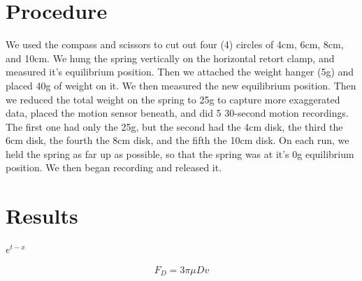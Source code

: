\documentclass[12pt,letterpaper]{article}
\begin{document}
\section{Procedure}

 We used the compass and scissors to cut out four (4) circles of 4cm, 6cm, 8cm, and 10cm. We hung the spring vertically on the horizontal retort clamp, and measured it's equilibrium position. Then we attached the weight hanger (5g) and placed 40g of weight on it. We then measured the new equilibrium position. Then we reduced the total weight on the spring to 25g to capture more exaggerated data, placed the motion sensor beneath, and did 5 30-second motion recordings. The first one had only the 25g, but the second had the 4cm disk, the third the 6cm disk, the fourth the 8cm disk, and the fifth the 10cm disk. On each run, we held the spring as far up as possible, so that the spring was at it's 0g equilibrium position. We then began recording and released it.

\section{Results}

$e^{t-x}$

\begin{equation}
    F_D=3\pi \mu Dv
\end{equation}
\end{document}
